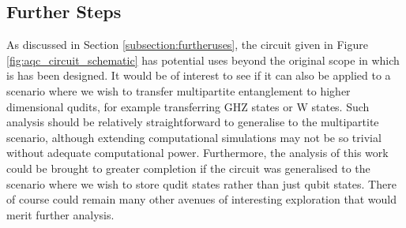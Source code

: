 \subsection{Further Steps}
\label{subsection:furthersteps}
As discussed in Section \ref{subsection:furtheruses}, the circuit given in Figure \ref{fig:aqc_circuit_schematic} has potential uses beyond the original scope in which is has been designed.
It would be of interest to see if it can also be applied to a scenario where we wish to transfer multipartite entanglement to higher dimensional qudits, for example transferring GHZ states or W states.
Such analysis should be relatively straightforward to generalise to the multipartite scenario, although extending computational simulations may not be so trivial without adequate computational power.
Furthermore, the analysis of this work could be brought to greater completion if the circuit was generalised to the scenario where we wish to store qudit states rather than just qubit states.
There of course could remain many other avenues of interesting exploration that would merit further analysis.